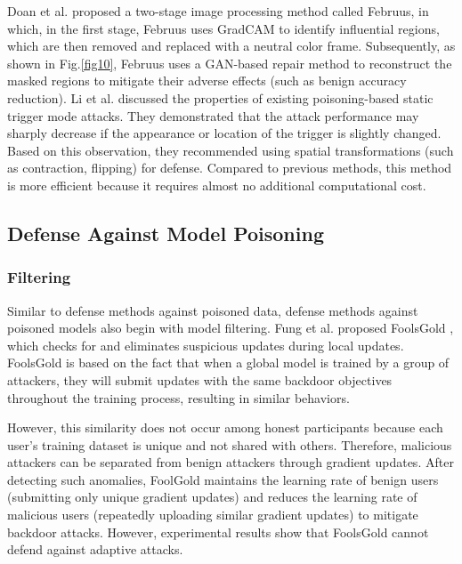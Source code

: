 \documentclass[conference]{IEEEtran}
\begin{document}
Doan et al. \cite{b76} proposed a two-stage image processing method called Februus, in which,
in the first stage, Februus uses GradCAM to identify influential regions, which are then
removed and replaced with a neutral color frame. Subsequently, as shown in Fig.\ref{fig10}, Februus uses a GAN-based
repair method to reconstruct the masked regions to mitigate their adverse effects (such as benign accuracy reduction).
Li et al. \cite{b77} discussed the properties of existing poisoning-based static trigger mode attacks. They demonstrated
that the attack performance may sharply decrease if the appearance or location of the trigger is slightly changed.
Based on this observation, they recommended using spatial transformations (such as contraction, flipping)
for defense. Compared to previous methods, this method is more efficient because it requires almost no additional computational cost.

\subsection{Defense Against Model Poisoning}
\subsubsection{Filtering}
Similar to defense methods against poisoned data, defense methods against poisoned models also begin with model filtering.
Fung et al. proposed FoolsGold \cite{b78}, which checks for and eliminates suspicious updates during local updates.
FoolsGold is based on the fact that when a global model is trained by a group of attackers, they will submit updates with
the same backdoor objectives throughout the training process, resulting in similar behaviors.

However, this similarity does not occur among honest participants because each user's training dataset is unique and not shared with others.
Therefore, malicious attackers can be separated from benign attackers through gradient updates. After detecting such anomalies,
FoolGold maintains the learning rate of benign users (submitting only unique gradient updates) and reduces the learning rate of malicious users
(repeatedly uploading similar gradient updates) to mitigate backdoor attacks. However, experimental results show that
FoolsGold cannot defend against adaptive attacks.
\end{document}
